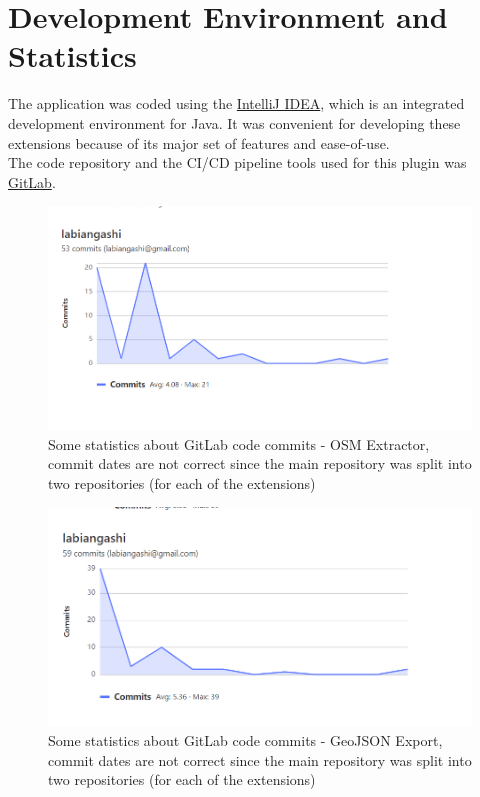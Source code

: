 \chapter{Development Environment and Statistics}
The application was coded using the \href{https://www.jetbrains.com/idea/}{IntelliJ IDEA}, which is an integrated development environment for Java.
It was convenient for developing these extensions because of its major set of features and ease-of-use.\\
\newline
The code repository and the CI/CD pipeline tools used for this plugin was \href{https://gitlab.com/}{GitLab}.
\begin{figure}[H]
    \includegraphics[width=\linewidth]{./Figures/Appendices/gitlab_commit_stats_osm_extractor}
    \caption{Some statistics about GitLab code commits - OSM Extractor, commit dates are not correct since the main
    repository was split into two repositories (for each of the extensions) }
\end{figure}
\begin{figure}[H]
    \includegraphics[width=\linewidth]{./Figures/Appendices/gitlab_commit_stats_geojson_export}
    \caption{Some statistics about GitLab code commits - GeoJSON Export, commit dates are not correct since the main
    repository was split into two repositories (for each of the extensions) }
\end{figure}
